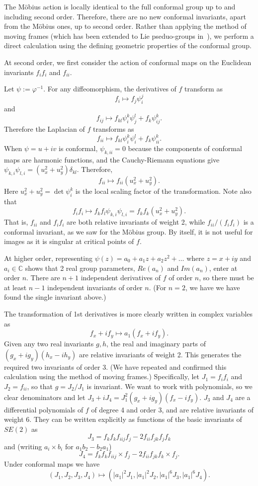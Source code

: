 \documentclass[review,onefignum,onetabnum]{siamonline190516}
\begin{document}
{The M\"obius action is locally identical to the full conformal group up to and including second order. Therefore, there are no new conformal invariants, apart from the M\"obius ones, up to second order. Rather than applying the method of moving frames (which has been extended to Lie pseduo-groups in~\cite{}), we perform a direct calculation using the defining geometric properties of the conformal group.

At second order, we first consider the action of conformal maps on the Euclidean invariants $f_i f_i$ and $f_{ii}$.

Let $\psi := \varphi^{-1}$. For any diffeomorphism, the derivatives of $f$ transform as
$$f_i \mapsto f_j \psi^j_i$$
and
$$f_{ij} \mapsto f_{kl} \psi^k_i\psi^l_j + f_{k}\psi^k_{ij}.$$
Therefore the Laplacian of $f$ transforms as
$$ f_{ii} \mapsto f_{kl} \psi^k_i \psi^l_i + f_k \psi^k_{ii}.$$
When $\psi=u + i v$ is conformal, $\psi_{k,ii}=0$ because the components of conformal maps are harmonic functions,
and the Cauchy-Riemann equations give $\psi_{k,i}\psi_{l,i} = (u_x^2 + u_y^2)\delta_{kl}$. Therefore,
$$ f_{ii} \mapsto f_{ii}(u_x^2+u_y^2).$$
Here $u_x^2+u_y^2=\det\psi^k_i$ is the local scaling factor of the transformation.
Note also that
$$f_i f_i \mapsto f_k f_l \psi_{k,i} \psi_{l,i} = f_k f_k (u_x^2 + u_y^2).$$
That is, $f_{ii}$ and $f_i f_i$ are both relative invariants of weight 2, while $f_{ii}/(f_i f_i)$ is a conformal invariant, as we saw for the M\"obius group. By itself, it is not useful for images as it is singular at critical points of $f$.

At higher order,  representing $\psi(z) = a_0 + a_1 z + a_2 z^2 + \dots$ where $z=x+iy$ and $a_i\in \mathbb{C}$ shows that 2 real group parameters, $Re(a_n)$ and $Im(a_n)$, enter at order $n$. There are $n+1$ independent derivatives of $f$ of order $n$, so there must be at least $n-1$ independent invariants of order $n$. (For $n=2$, we have we have found the single invariant above.)

The transformation of 1st derivatives is more clearly written in complex variables as $$ f_x + i f_y \mapsto a_1 (f_x + i f_y).$$ Given any two real invariants $g,h$, the real and imaginary parts of $(g_x+i g_y)(h_x-i h_y)$ are relative invariants of weight 2. This generates the required two invariants of order 3. (We have repeated and confirmed this calculation using the method of moving frames.) Specifically, let $J_1 = f_i f_i$ and  $J_2 = f_{ii}$, so that  $g = J_2/J_1$ is invariant.  We want to work with polynomials, so we clear denominators and let $J_3+iJ_4 = J_1^2 (g_x + i g_y)  (f_x - i f_y)$. $J_3$ and $J_4$ are a differential polynomials of $f$ of degree 4 and order 3, and are relative invariants of weight 6. They can be written explicitly as functions of the basic invariants of $SE(2)$ as
$$J_3 = f_k f_k f_{iij}f_j - 2 f_{ii} f_{jk} f_j f_k$$
and (writing $a_i\times b_i$ for $a_1 b_2 - b_2 a_1$)
$$ J_4 = f_k f_k f_{iij}\times f_j - 2 f_{ii} f_{jk} f_k\times f_j.$$
Under conformal maps we have
$$ (J_1,J_2,J_3,J_4) \mapsto (|a_1|^2 J_1, |a_1|^2 J_2, |a_1|^6 J_3,|a_1|^6 J_4).$$

}
\end{document}
